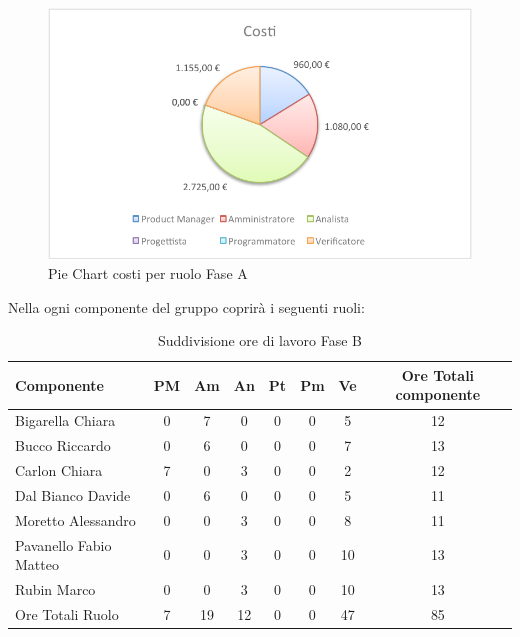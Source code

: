				\begin{figure}[H]\centering
					\includegraphics[width=\textwidth]{PianoDiProgetto/Pics/ChartTotCostiFaseA.pdf}
					\caption{Pie Chart costi per ruolo Fase A}
				\end{figure}
				Nella  ogni componente del gruppo \groupname{} coprirà i seguenti ruoli:
				\begin{table}[H]
					\begin{center}
						\begin{tabular}{| l | c | c | c | c | c | c | c |}
							\hline
							Componente 					& PM	& Am 	& An 	& Pt 	& Pm 	& Ve 		& Ore Totali componente \\ \hline
							
							Bigarella Chiara 			& 0		& 7 	& 0		& 0		& 0		& 5 		& 12 \\
							Bucco Riccardo 				& 0		& 6 	& 0		& 0		& 0		& 7 		& 13 \\
							Carlon Chiara	 			& 7 	& 0		& 3 	& 0		& 0		& 2 		& 12 \\
							Dal Bianco Davide 			& 0		& 6 	& 0		& 0		& 0		& 5 		& 11 \\
							Moretto Alessandro 			& 0		& 0		& 3 	& 0		& 0		& 8 		& 11 \\
							Pavanello Fabio Matteo	 	& 0		& 0		& 3 	& 0		& 0		& 10 		& 13 \\
							Rubin Marco					& 0		& 0		& 3 	& 0		& 0		& 10 		& 13 \\ \hline \hline
							
							Ore Totali Ruolo 			& 7 	& 19 	& 12 	& 0		& 0		& 47 		& 85\\ \hline
						\end{tabular}
					\end{center}
					\caption{Suddivisione ore di lavoro Fase B}
				\end{table}
